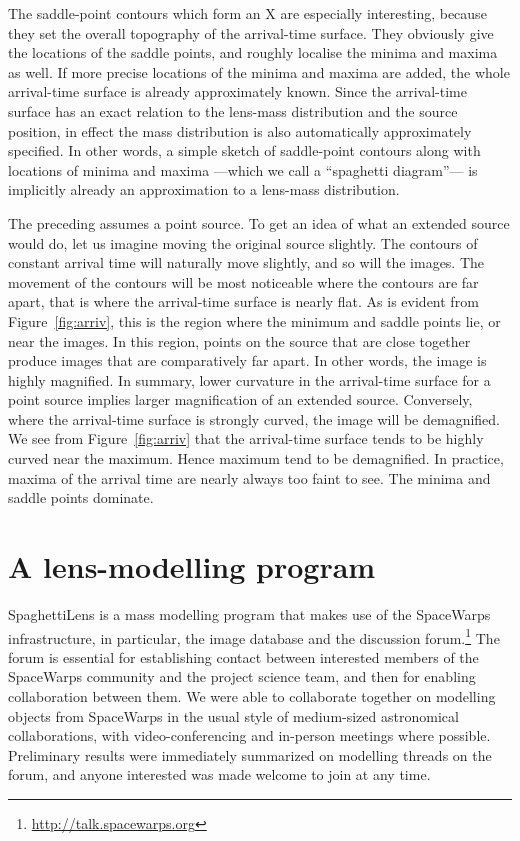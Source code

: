 \documentclass[usenatbib]{mn2e}
\newcommand{\spl}{SpaghettiLens\xspace}
\newcommand{\sw}{SpaceWarps\xspace}
\newcommand{\figref}[1]{Figure~\ref{fig:#1}}
\begin{document}
The saddle-point contours which form an X are especially interesting,
because they set the overall topography of the arrival-time surface.
They obviously give the locations of the saddle points, and roughly
localise the minima and maxima as well.  If more precise locations of
the minima and maxima are added, the whole arrival-time surface is
already approximately known.  Since the arrival-time surface has an
exact relation to the lens-mass distribution and the source position,
in effect the mass distribution is also automatically approximately
specified.  In other words, a simple sketch of saddle-point contours
along with locations of minima and maxima ---which we call a
``spaghetti diagram''--- is implicitly already an approximation to a
lens-mass distribution.

The preceding assumes a point source.  To get an idea of what an
extended source would do, let us imagine moving the original source
slightly.  The contours of constant arrival time will naturally move
slightly, and so will the images.  The movement of the contours will
be most noticeable where the contours are far apart, that is where the
arrival-time surface is nearly flat.  As is evident from
\figref{arriv}, this is the region where the minimum and saddle points
lie, or near the images.  In this region, points on the source that
are close together produce images that are comparatively far apart.
In other words, the image is highly magnified.  In summary, lower
curvature in the arrival-time surface for a point source implies
larger magnification of an extended source.  Conversely, where the
arrival-time surface is strongly curved, the image will be
demagnified.  We see from \figref{arriv} that the arrival-time surface
tends to be highly curved near the maximum.  Hence maximum tend to be
demagnified.  In practice, maxima of the arrival time are nearly
always too faint to see. The minima and saddle points dominate.



\section{A lens-modelling program}
\label{sec:SpaghettiLens}

\spl is a mass modelling program that makes use of the \sw
infrastructure, in particular, the image database and the discussion
forum.\footnote{\url{ http://talk.spacewarps.org}} The forum is
essential for establishing contact between interested members of the
\sw community and the project science team, and then for enabling
collaboration between them. We were able to collaborate together on
modelling objects from \sw in the usual style of medium-sized
astronomical collaborations, with video-conferencing and in-person
meetings where possible. Preliminary results were immediately
summarized on modelling threads on the forum, and anyone interested
was made welcome to join at any time.
\end{document}
